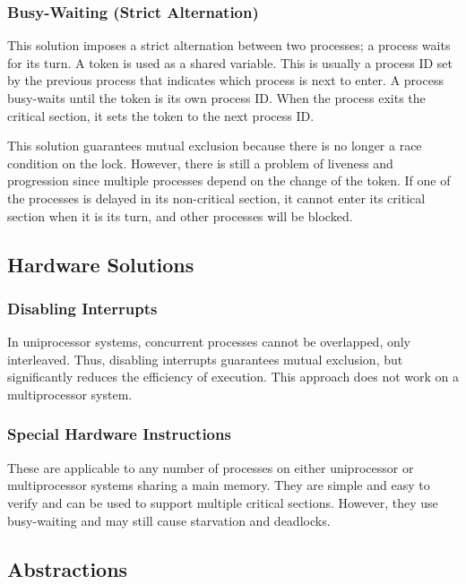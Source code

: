 \subsubsection{Busy-Waiting (Strict Alternation)}

This solution imposes a strict alternation between two processes; a process waits for its turn.
A token is used as a shared variable.
This is usually a process ID set by the previous process that indicates which process is next to enter.
A process busy-waits until the token is its own process ID\@.
When the process exits the critical section, it sets the token to the next process ID.

This solution guarantees mutual exclusion because there is no longer a race condition on the lock.
However, there is still a problem of liveness and progression since multiple processes depend on the change of the token.
If one of the processes is delayed in its non-critical section, it cannot enter its critical section when it is its turn, and other processes will be blocked.

\subsection{Hardware Solutions}

\subsubsection{Disabling Interrupts}

In uniprocessor systems, concurrent processes cannot be overlapped, only interleaved.
Thus, disabling interrupts guarantees mutual exclusion, but significantly reduces the efficiency of execution.
This approach does not work on a multiprocessor system.

\subsubsection{Special Hardware Instructions}

These are applicable to any number of processes on either uniprocessor or multiprocessor systems sharing a main memory.
They are simple and easy to verify and can be used to support multiple critical sections.
However, they use busy-waiting and may still cause starvation and deadlocks.

\subsection{Abstractions}

